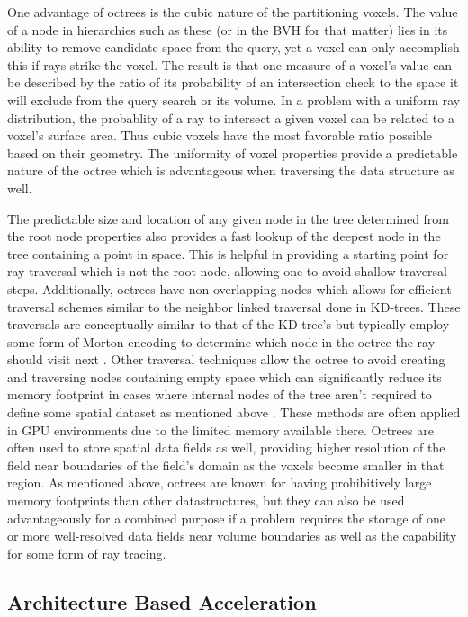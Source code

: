\documentclass[12pt, a4paper]{article}
\begin{document}
One advantage of octrees is the cubic nature of the partitioning voxels. The value of a node in hierarchies such as these (or in the BVH for that matter) lies in its ability to remove candidate space from the query, yet a voxel can only accomplish this if rays strike the voxel. The result is that one measure of a voxel's value can be described by the ratio of its probability of an intersection check to the space it will exclude from the query search or its volume. In a problem with a uniform ray distribution, the probablity of a ray to intersect a given voxel can be related to a voxel's surface area. Thus cubic voxels have the most favorable ratio possible based on their geometry. The uniformity of voxel properties provide a predictable nature of the octree which is advantageous when traversing the data structure as well. 

The predictable size and location of any given node in the tree determined from the root node properties also provides a fast lookup of the deepest node in the tree containing a point in space. This is helpful in providing a starting point for ray traversal which is not the root node, allowing one to avoid shallow traversal steps. Additionally, octrees have non-overlapping nodes which allows for efficient traversal schemes similar to the neighbor linked traversal done in KD-trees. These traversals are conceptually similar to that of the KD-tree's but typically employ some form of Morton encoding to determine which node in the octree the ray should visit next \cite{Revelles_2000}. Other traversal techniques allow the octree to avoid creating and traversing nodes containing empty space which can significantly reduce its memory footprint in cases where internal nodes of the tree aren't required to define some spatial dataset as mentioned above \cite{Samet_1989}. These methods are often applied in GPU environments due to the limited memory available there. Octrees are often used to store spatial data fields as well, providing higher resolution of the field near boundaries of the field's domain as the voxels become smaller in that region. As mentioned above, octrees are known for having prohibitively large memory footprints than other datastructures, but they can also be used advantageously for a combined purpose if a problem requires the storage of one or more well-resolved data fields near volume boundaries as well as the capability for some form of ray tracing.


\subsection{Architecture Based Acceleration}%
\label{subsec:arch}
\end{document}
